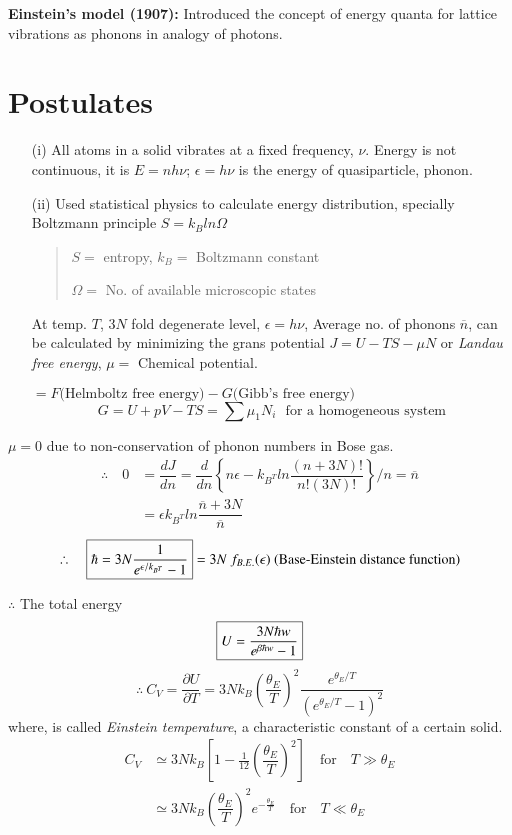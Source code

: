 \noindent
{\bf Einstein's model (1907):} Introduced the concept of energy quanta for lattice vibrations as phonons in analogy of photons.

\section*{Postulates}
\begin{itemize}
\item[(i)] All atoms in a solid vibrates at a fixed frequency, $\nu$. Energy is not continuous, it is $E=nh\nu$; $\epsilon=h\nu$ is the energy of quasiparticle, phonon.

\item[(ii)] Used statistical physics to calculate energy distribution, specially Boltzmann principle $S=k_{B}ln\Omega$
\begin{quote}
$S=$ entropy, $k_{B}=$ Boltzmann constant

$\Omega=$ No. of available microscopic states
\end{quote}
At temp. $T$, $3N$ fold degenerate level, $\epsilon=h\nu$, Average no. of phonons $\overline{n}$, can be calculated by minimizing the grans potential $J=U-TS-\mu N$ or {\em Landau free energy}, $\mu=$ Chemical potential.

$=F \text{(Helmboltz free energy)} -G \text{(Gibb's free energy)}$ 
$$
G=U+pV-TS=\sum\mu_{1}N_{i}\text{~ for a homogeneous system}
$$
\end{itemize}

$\mu=0$ due to non-conservation of phonon numbers in Bose gas.
\begin{align*}
\therefore\quad 0 &=\dfrac{dJ}{dn}=\dfrac{d}{dn}\left\{n\epsilon-k_{B^{T}}ln \dfrac{(n+3N)!}{n!(3N)!}\right\}/n=\overline{n}\\
&= \epsilon  k_{B^{T}}ln \dfrac{\overline{n}+3N}{\overline{n}}
\end{align*}
$$
\therefore\quad \fbox{$\hbar = 3N \dfrac{1}{e^{\epsilon/k_{B^{T}}}-1}$}=3N \ f_{B.E.}(\epsilon) \text{ (Base-Einstein distance function)}
$$

$\therefore$ The total energy 
$$
\fbox{$U=\dfrac{3N\hbar w}{e^{\beta\hbar w}-1}$}
$$
$$
\therefore \ C_{V}=\dfrac{\partial U}{\partial T}=3Nk_{B}\left(\dfrac{\theta_{E}}{T}\right)^{2}\dfrac{e^{\theta_{E}/T}}{(e^{\theta_{E}/T}-1)^{2}}
$$
where,  is called {\em Einstein temperature}, a characteristic constant of a certain solid.
\begin{align*}
C_{V} &\simeq 3Nk_{B}\left[1-\frac{1}{12}\left(\dfrac{\theta_{E}}{T}\right)^{2}\right]\quad\text{for}\quad T\gg \theta_{E}\\
&\simeq 3Nk_{B}\left(\dfrac{\theta_{E}}{T}\right)^{2}e^{-\frac{\theta_{E}}{T}}\quad\text{for}\quad T\ll \theta_{E}
\end{align*}

